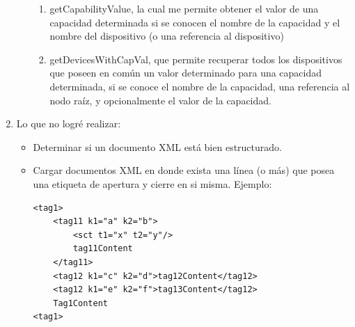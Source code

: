 \documentclass[../main.tex]{subfiles}
\begin{document}
\begin{enumerate}
\begin{itemize}
\begin{enumerate}
	 		\item getCapabilityValue, la cual me permite obtener el valor de una capacidad determinada si se conocen el nombre de la capacidad y el nombre del dispositivo (o una referencia al dispositivo)
	 		\item getDevicesWithCapVal, que permite recuperar todos los dispositivos que poseen en común un valor determinado para una capacidad determinada, si se conoce el nombre de la capacidad, una referencia al nodo raíz, y opcionalmente el valor de la capacidad.
	 	\end{enumerate}
	 \end{itemize}
	 
	 \clearpage
 \item Lo que no logré realizar:
 	\begin{itemize}
 	\item Determinar si un documento XML está bien estructurado.
 	\item Cargar documentos XML en donde exista una línea (o más) que posea una etiqueta de apertura y cierre en si misma. Ejemplo:
 	\lstset{language=XML}
		\begin{lstlisting}[caption= Documento que la aplicación no logra cargar, frame=none]
<tag1>
	<tag11 k1="a" k2="b">
		<sct t1="x" t2="y"/>
		tag11Content
	</tag11>
	<tag12 k1="c" k2="d">tag12Content</tag12>
	<tag12 k1="e" k2="f">tag13Content</tag12>
	Tag1Content
<tag1>
		\end{lstlisting}
 	\end{itemize}
\end{enumerate}
 
\end{document}
